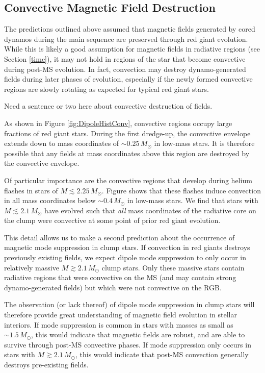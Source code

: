 \subsection{Convective Magnetic Field Destruction}

The predictions outlined above assumed that magnetic fields generated by cored dynamos during the main sequence are preserved through red giant evolution. While this is likely a good assumption for magnetic fields in radiative regions (see Section \ref{time}), it may not hold in regions of the star that become convective during post-MS evolution. In fact, convection may destroy dynamo-generated fields during later phases of evolution, especially if the newly formed convective regions are slowly rotating as expected for typical red giant stars.

Need a sentence or two here about convective destruction of fields. 

As shown in Figure \ref{fig:DipoleHistConv}, convective regions occupy large fractions of red giant stars. During the first dredge-up, the convective envelope extends down to mass coordinates of $ \sim 0.25 \! \, M_\odot$ in low-mass stars. It is therefore possible that any fields at mass coordinates above this region are destroyed by the convective envelope.

Of particular importance are the convective regions that develop during helium flashes in stars of $M \lesssim 2.25 \, M_\odot$. Figure \label{fig:DipoleHistConv} shows that these flashes induce convection in all mass coordinates below $ \sim \! 0.4 \, M_\odot$ in low-mass stars. We find that stars with $M \lesssim 2.1 \, M_\odot$ have evolved such that {\it all} mass coordinates  of the radiative core on the clump were convective at some point of prior red giant evolution. 

This detail allows us to make a second prediction about the occurrence of magnetic mode suppression in clump stars. If convection in red giants destroys previously existing fields, we expect dipole mode suppression to only occur in relatively massive $M \gtrsim 2.1 \, M_\odot$ clump stars. Only these massive stars contain radiative regions that were convective on the MS (and may contain strong dynamo-generated fields) but which were not convective on the RGB. 

The observation (or lack thereof) of dipole mode suppression in clump stars will therefore provide great understanding of magnetic field evolution in stellar interiors. If mode suppression is common in stars with masses as small as $\sim \! 1.5 \, M_\odot$, this would indicate that magnetic fields are robust, and are able to survive through post-MS convective phases. If mode suppression only occurs in stars with $M \gtrsim 2.1 \, M_\odot$, this would indicate that post-MS convection generally destroys pre-existing fields. 
    
    
    